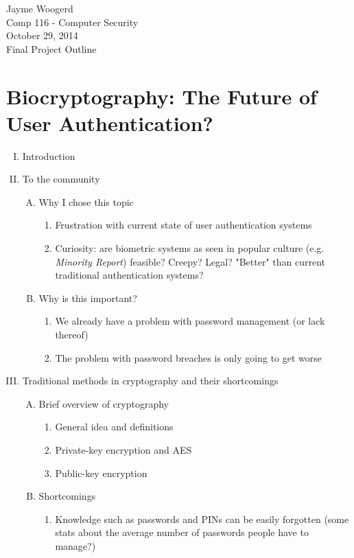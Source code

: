 \documentclass[10pt]{article}
\begin{document}
Jayme Woogerd \\
\indent Comp 116 - Computer Security \\
\indent October 29, 2014 \\
\indent Final Project Outline

\section*{Biocryptography: The Future of User Authentication?}
\begin{enumerate}[I.]
\item Introduction
\item To the community
    \begin{enumerate}[A.]
    \item Why I chose this topic
        \begin{enumerate}[1.]
        \item Frustration with current state of user authentication systems
        \item Curiosity: are biometric systems as seen in popular culture (e.g. \textit{Minority Report}) feasible? Creepy? Legal? "Better" than current traditional authentication systems?
        \end{enumerate}
    \item Why is this important?
        \begin{enumerate}[1.]
        \item We already have a problem with password management (or lack thereof)
        \item The problem with password breaches is only going to get worse
        \end{enumerate}
    \end{enumerate}
\item Traditional methods in cryptography and their shortcomings
    \begin{enumerate}[A.]
    \item Brief overview of cryptography
        \begin{enumerate}[1.]
        \item General idea and definitions
        \item Private-key encryption and AES
        \item Public-key encryption
        \end{enumerate}
    \item Shortcomings
        \begin{enumerate}[1.]
        \item Knowledge such as passwords and PINs can be easily forgotten (some stats about the average number of passwords people have to manage?)

\end{enumerate}
\end{enumerate}
\end{enumerate}
\end{document}
